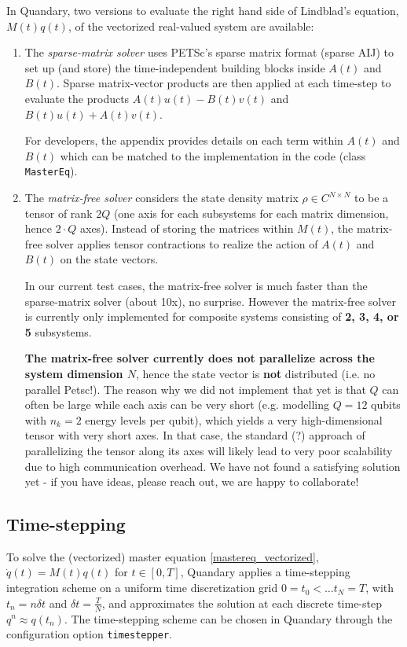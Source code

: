\documentclass[11pt]{article}
\begin{document}
   In Quandary, two versions to evaluate the right hand side of Lindblad's
   equation, $M(t)q(t)$, of the vectorized real-valued system are available: 
   \begin{enumerate}
     \item The \textit{sparse-matrix solver} uses PETSc's sparse matrix format (sparse AIJ) to set up (and store) the time-independent building blocks inside $A(t)$ and $B(t)$. Sparse matrix-vector products are then applied at each time-step to evaluate the products $A(t)u(t) - B(t) v(t)$ and $B(t)u(t) + A(t)v(t)$.  
     
     For developers, the appendix provides details on each term within $A(t)$ and $B(t)$ which can be matched to the implementation in the code (class \texttt{MasterEq}). 

     \item The \textit{matrix-free solver} considers the state density matrix $\rho\in C^{N\times N}$ to be a tensor of rank $2Q$ (one axis for each subsystems for each matrix dimension, hence $2\cdot Q$ axes). Instead of storing the matrices within $M(t)$, the matrix-free solver applies tensor contractions to realize the action of $A(t)$ and $B(t)$ on the state vectors. 

    In our current test cases, the matrix-free solver is much faster than the sparse-matrix solver (about 10x), no surprise. However the matrix-free solver is currently only implemented for composite systems consisting of \textbf{2, 3, 4, or 5} subsystems. 

    \textbf{The matrix-free solver currently does not parallelize across the system dimension $N$}, hence the state vector is \textbf{not} distributed (i.e. no parallel Petsc!). The reason why we did not implement that yet is that $Q$ can often be large while each axis can be very short (e.g. modelling $Q=12$ qubits with $n_k=2$ energy levels per qubit), which yields a very high-dimensional tensor with very short axes. In that case, the standard (?) approach of parallelizing the tensor along its axes will likely lead to very poor scalability due to high communication overhead. We have not found a satisfying solution yet - if you have ideas, please reach out, we are happy to collaborate! 
   \end{enumerate} 


    \subsection{Time-stepping}
    To solve the (vectorized) master equation \eqref{mastereq_vectorized}, $\dot
    q(t) = M(t) q(t)$ for $t\in [0,T]$, Quandary applies a time-stepping integration
    scheme on a uniform time discretization grid $0=t_0 < \dots t_{N} = T$, with
    $t_n = n \delta t$ and $\delta t = \frac{T}{N}$, and approximates the
    solution at each discrete time-step $q^{n} \approx q(t_n)$. The time-stepping scheme can be chosen in Quandary through the configuration option \texttt{timestepper}. 
    
\end{document}
